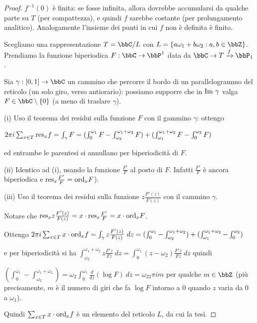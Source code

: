 \begin{proof}
$f^{-1}(0)$ è finita: se fosse infinita, allora dovrebbe accumularsi da qualche parte su $T$ (per compattezza), e quindi $f$ sarebbe costante (per prolungamento analitico).
Analogamente l'insieme dei punti in cui $f$ non è definita è finito.

Scegliamo una rappresentazione $T=\bbC/L$ con $L=\{a\omega_1+b\omega_2 : a,b\in\bbZ\}$. Prendiamo la funzione biperiodica $F:\bbC\rar\bbP^1$ data da $\bbC\rar T\xrightarrow{f}\bbP_1$.

Sia $\gamma:[0,1]\rar\bbC$ un cammino che percorre il bordo di un parallelogrammo del reticolo (un solo giro, verso antiorario):
possiamo supporre che in $\text{Im }\gamma$ valga $F\in\bbC\setminus\{0\}$ (a meno di traslare $\gamma$).

(i) Uso il teorema dei residui sulla funzione $F$ con il gammino $\gamma$: ottengo

$2\pi i\sum_{x\in T}\text{res}_xf=\int_\gamma F=(\int_0^{\omega_1}F-\int_{\omega_2}^{\omega_1+\omega_2}F)+(\int_{\omega_1}^{\omega_1+\omega_2}F-\int_{0}^{\omega_2}F)$

ed entrambe le parentesi si annullano per biperiodicità di $F$.


(ii) Identico ad (i), usando la funzione $\frac{F'}{F}$ al posto di $F$. Infatti $\frac{F'}{F}$ è ancora biperiodica e $\text{res}_x\frac{F'}{F}=\text{ord}_xF$).

(iii) Uso il teorema dei residui sulla funzione $z\frac{F'(z)}{F(z)}$ con il cammino $\gamma$.

Notare che $\text{res}_xz\frac{F'(z)}{F(z)}=x\cdot\text{res}_x\frac{F'}{F}=x\cdot\text{ord}_xF$.

Ottengo $2\pi i\sum_{x\in T}x\cdot\ord_xf=\int_\gamma z\frac{F'(z)}{F(z)}\ dz=(\int_0^{\omega_1}-\int_{\omega_2}^{\omega_1+\omega_2})+(\int_{\omega_1}^{\omega_1+\omega_2}-\int_{0}^{\omega_2})$

e per biperiodicità si ha $\int_{\omega_2}^{\omega_1+\omega_2}z\frac{F'z}{Fz}\ dz=\int_0^{\omega_1}(z-\omega_2)\frac{F'z}{Fz}\ dz$ quindi

$(\int_0^{\omega_1}-\int_{\omega_2}^{\omega_1+\omega_2})=\omega_2\int_0^{\omega_1}\frac{d}{dz}(\log F)\ dz=\omega_22\pi i m$ per qualche $m\in\bbZ$
(più precisamente, $m$ è il numero di giri che fa $\log F$ intorno a $0$ quando $z$ varia da $0$ a $\omega_1$).

Quindi $\sum_{x\in T}x\cdot\text{ord}_xf$ è un elemento del reticolo $L$, da cui la tesi.
\end{proof}


